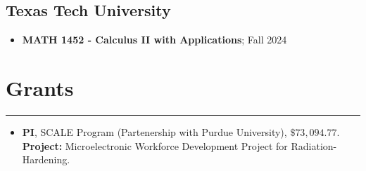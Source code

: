 \documentclass[12pt]{book}
\begin{document}
\begin{itemize}


\end{itemize}

\subsection*{Texas Tech University}
\begin{itemize}
	\item \textbf{MATH 1452 - Calculus II with Applications}; Fall 2024
\end{itemize}



\section*{Grants} \rule{\textwidth}{1pt}

\begin{itemize}
	\item \textbf{PI}, SCALE Program (Partenership with Purdue University), $\$73,094.77$.\\
	\textbf{Project:} Microelectronic Workforce Development Project for Radiation-Hardening.
\end{itemize}
\end{document}
